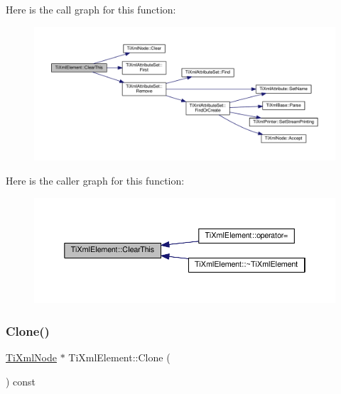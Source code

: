 Here is the call graph for this function\+:\nopagebreak
\begin{figure}[H]
\begin{center}
\leavevmode
\includegraphics[width=350pt]{class_ti_xml_element_a5670933ec2d7d9763b9891acc05d7f7d_cgraph}
\end{center}
\end{figure}
Here is the caller graph for this function\+:\nopagebreak
\begin{figure}[H]
\begin{center}
\leavevmode
\includegraphics[width=350pt]{class_ti_xml_element_a5670933ec2d7d9763b9891acc05d7f7d_icgraph}
\end{center}
\end{figure}
\mbox{\label{class_ti_xml_element_a810ea8fa40844c01334e5af2a26794cb}} 
\subsubsection{\texorpdfstring{Clone()}{Clone()}}
{\footnotesize\ttfamily \hyperlink{class_ti_xml_node}{Ti\+Xml\+Node} $\ast$ Ti\+Xml\+Element\+::\+Clone (\begin{DoxyParamCaption}{ }\end{DoxyParamCaption}) const\hspace{0.3cm}{\ttfamily [virtual]}}



